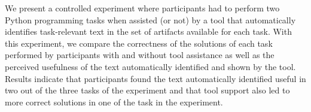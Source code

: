 We present a controlled experiment where participants had to 
perform two Python programming tasks when assisted (or not) by a tool that automatically identifies task-relevant text 
in the set of artifacts available for each task. 
With this experiment, we compare the correctness of the solutions of each task 
performed by participants with and without tool assistance
as well as the perceived usefulness of the text automatically identified and shown by the tool. 
Results indicate that participants found the text automatically identified
useful in two out of the three tasks of the experiment
and that tool support also led to more correct solutions 
in one of the task in the experiment.








